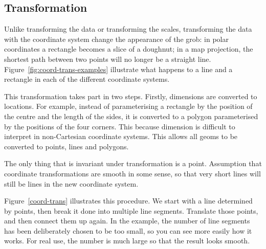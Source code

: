 \subsection{Transformation}
\label{sub:coord-transformation}

Unlike transforming the data or transforming the scales, transforming the data with the coordinate system change the appearance of the grob: in polar coordinates a rectangle becomes a slice of a doughnut; in a map projection, the shortest path between two points will no longer be a straight line.  Figure~\ref{fig:coord-trans-examples} illustrate what happens to a line and a rectangle in each of the different coordinate systems.

% 

This transformation takes part in two steps.  Firstly, dimensions are converted to locations.  For example, instead of parameterising a rectangle by the position of the centre and the length of the sides, it is converted to a polygon parameterised by the positions of the four corners.  This because dimension is difficult to interpret in non-Cartesian coordinate systems.  This allows all geoms to be converted to points, lines and polygons.  

The only thing that is invariant under transformation is a point.  Assumption that coordinate transformations are smooth in some sense, so that very short lines will still be lines in the new coordinate system.

Figure~\ref{coord-trans} illustrates this procedure.  We start with a line determined by points, then break it done into multiple line segments.  Translate those points, and then connect them up again.  In the example, the number of line segments has been deliberately chosen to be too small, so you can see more easily how it works.  For real use, the number is much large so that the result looks smooth.

% 
%
% 


